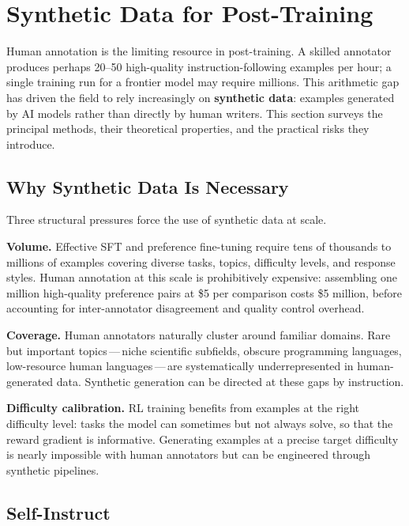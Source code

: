 \section{Synthetic Data for Post-Training}
\label{sec:synthetic-data}

Human annotation is the limiting resource in post-training. A skilled annotator produces perhaps 20--50 high-quality instruction-following examples per hour; a single training run for a frontier model may require millions. This arithmetic gap has driven the field to rely increasingly on \textbf{synthetic data}: examples generated by AI models rather than directly by human writers. This section surveys the principal methods, their theoretical properties, and the practical risks they introduce.

\subsection{Why Synthetic Data Is Necessary}

Three structural pressures force the use of synthetic data at scale.

\textbf{Volume.} Effective SFT and preference fine-tuning require tens of thousands to millions of examples covering diverse tasks, topics, difficulty levels, and response styles. Human annotation at this scale is prohibitively expensive: assembling one million high-quality preference pairs at \$5 per comparison costs \$5 million, before accounting for inter-annotator disagreement and quality control overhead.

\textbf{Coverage.} Human annotators naturally cluster around familiar domains. Rare but important topics\,---\,niche scientific subfields, obscure programming languages, low-resource human languages\,---\,are systematically underrepresented in human-generated data. Synthetic generation can be directed at these gaps by instruction.

\textbf{Difficulty calibration.} RL training benefits from examples at the right difficulty level: tasks the model can sometimes but not always solve, so that the reward gradient is informative. Generating examples at a precise target difficulty is nearly impossible with human annotators but can be engineered through synthetic pipelines.

\subsection{Self-Instruct}

